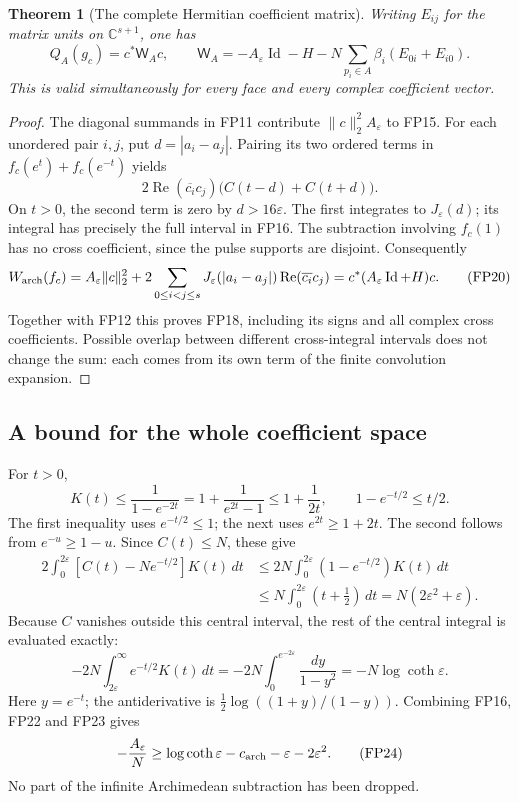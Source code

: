 \documentclass[11pt,a4paper]{article}
\newtheorem{theorem}{Theorem}[section]
\theoremstyle{definition}\newtheorem{definition}[theorem]{Definition}
\newcommand{\C}{\mathbb C}\newcommand{\R}{\mathbb R}
\begin{document}
\begin{theorem}[The complete Hermitian coefficient matrix]
\label{fp:thm:matrix}
Writing \(E_{ij}\) for the matrix units on \(\C^{s+1}\), one has
\[
 \boxed{\quad
 Q_A(g_c)=c^*\mathsf W_Ac,\qquad
 \mathsf W_A=-A_\varepsilon\operatorname{Id}-H
       -N\sum_{p_i\in A}\beta_i(E_{0i}+E_{i0}).
 \quad}
 \tag{FP18}\label{fp:fpb:matrix}
\]
This is valid simultaneously for every face and every complex
coefficient vector.
\end{theorem}
\begin{proof}
The diagonal summands in FP11 contribute
\(\|c\|_2^2 A_\varepsilon\) to FP15. For each unordered pair \(i,j\),
put \(d=|a_i-a_j|\). Pairing its two ordered terms in
\(f_c(e^t)+f_c(e^{-t})\) yields
\[
 2\operatorname{Re}(\overline{c_i}c_j)
                 \bigl(C(t-d)+C(t+d)\bigr).
 \tag{FP19}
\]
On \(t>0\), the second term is zero by \(d>16\varepsilon\).
The first integrates to \(J_\varepsilon(d)\); its integral has precisely
the full interval in FP16. The subtraction involving \(f_c(1)\)
has no cross coefficient, since the pulse supports are disjoint.
Consequently
\[
 W_{\rm arch}(f_c)
  =A_\varepsilon\|c\|_2^2+
      2\sum_{0\le i<j\le s}
          J_\varepsilon(|a_i-a_j|)\operatorname{Re}(\overline{c_i}c_j)
  =c^*(A_\varepsilon\operatorname{Id}+H)c.
 \tag{FP20}
\]
Together with FP12 this proves FP18, including its signs and
all complex cross coefficients. Possible overlap between different
cross-integral intervals does not change the sum: each comes
from its own term of the finite convolution expansion.
\end{proof}

\subsection{A bound for the whole coefficient space}

For \(t>0\),
\[
 K(t)\le\frac1{1-e^{-2t}}
   =1+\frac1{e^{2t}-1}\le1+\frac1{2t},
 \qquad 1-e^{-t/2}\le t/2.
 \tag{FP21}\label{fp:fpb:kernel-bound}
\]
The first inequality uses \(e^{-t/2}\le1\); the next uses
\(e^{2t}\ge1+2t\). The second follows from \(e^{-u}\ge1-u\).
Since \(C(t)\le N\), these give
\[
 \begin{aligned}
 2\int_0^{2\varepsilon}[C(t)-Ne^{-t/2}]K(t)\,dt
 &\le2N\int_0^{2\varepsilon}(1-e^{-t/2})K(t)\,dt\\
 &\le N\int_0^{2\varepsilon}(t+\tfrac12)\,dt
   =N(2\varepsilon^2+\varepsilon).
 \end{aligned}
 \tag{FP22}
\]
Because \(C\) vanishes outside this central interval, the rest of
the central integral is evaluated exactly:
\[
 -2N\int_{2\varepsilon}^\infty e^{-t/2}K(t)\,dt
   =-2N\int_0^{e^{-2\varepsilon}}\frac{dy}{1-y^2}
   =-N\log\coth\varepsilon .
 \tag{FP23}\label{fp:fpb:tail}
\]
Here \(y=e^{-t}\); the antiderivative is
\(\tfrac12\log((1+y)/(1-y))\).
Combining FP16, FP22 and FP23 gives
\[
 -\frac{A_\varepsilon}{N}
 \ge\log\coth\varepsilon-c_{\rm arch}-\varepsilon-2\varepsilon^2.
 \tag{FP24}\label{fp:fpb:central-bound}
\]
No part of the infinite Archimedean subtraction has been dropped.
\end{document}
